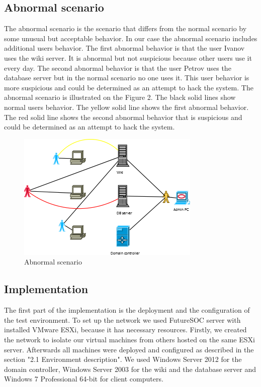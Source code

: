 \subsection{Abnormal scenario}
The abnormal scenario is the scenario that differs from the normal scenario by some unusual but acceptable behavior. In our case the abnormal scenario includes additional users behavior. The first abnormal behavior is that the user Ivanov uses the wiki server. It is abnormal but not suspicious because other users use it every day. The second abnormal behavior is that the user Petrov uses the database server but in the normal scenario no one uses it. This user behavior is more suspicious and could be determined as an attempt to hack the system. The abnormal scenario is illustrated on the Figure 2. The black solid lines show normal users behavior. The yellow solid line shows the first abnormal behavior. The red solid line shows the second abnormal behavior that is suspicious and could be determined as an attempt to hack the system. 
\begin{figure}[ht!]
\centering
\includegraphics{scenario_abnormal.png}
\caption{Abnormal scenario}
\label{overflow}
\end{figure}

\subsection{Implementation}
The first part of the implementation is the deployment and the configuration of the test environment. To set up the network we used FutureSOC server with installed VMware ESXi, because it has necessary resources. Firstly, we created the network to isolate our virtual machines from others hosted on the same ESXi server. Afterwards all machines were deployed and configured as described in the section "2.1 Environment description". We used Windows Server 2012 for the domain controller, Windows Server 2003 for the wiki and the database server and Windows 7 Professional 64-bit for client computers. 

